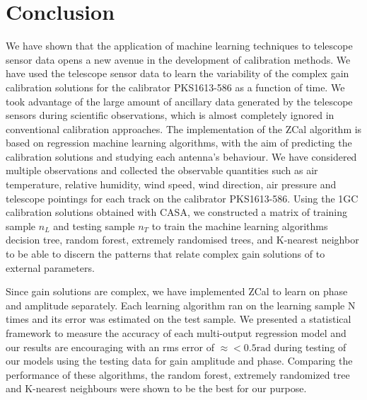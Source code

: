 \chapter{Conclusion}

We have shown that the application of machine learning techniques to telescope sensor data opens a new avenue in the development of calibration methods. We have used the telescope sensor data to learn the variability of the complex gain calibration solutions for the calibrator PKS1613-586 as a function of time. We took advantage of the large amount of ancillary data generated by the telescope sensors during scientific observations, which is almost completely ignored in conventional calibration approaches. The implementation of the ZCal algorithm is based on regression machine learning algorithms, with the aim of predicting the calibration solutions and studying each antenna’s behaviour. We have considered multiple observations and collected the observable quantities such as air temperature, relative humidity, wind speed, wind direction, air pressure and telescope pointings for each track on the calibrator PKS1613-586. Using the 1GC calibration solutions obtained with CASA, we constructed a matrix of training sample $n_L$ and testing sample $n_T$ to train the machine learning algorithms decision tree, random forest, extremely randomised trees, and K-nearest neighbor to be able to discern the patterns that relate complex gain solutions of  to external parameters.

Since gain solutions are complex, we have implemented ZCal to learn on phase and amplitude separately.  Each learning algorithm ran on the learning sample N times and its error was estimated on the test sample. We presented a statistical framework to measure the accuracy of each multi-output regression model and our results are encouraging with an rms error of $\approx < 0.5 \mathrm{rad}$ during testing of our models using the testing data for gain amplitude and phase. Comparing the performance of these algorithms, the random forest, extremely randomized tree and K-nearest neighbours were shown to be the best for our purpose.

